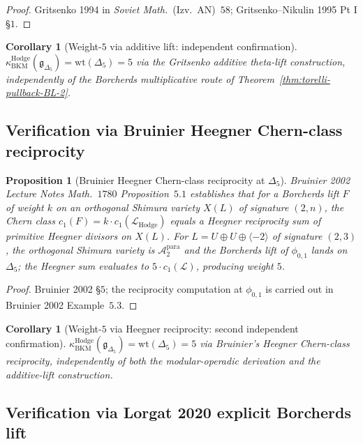 \documentclass[11pt]{article}
\newtheorem{proposition}[theorem]{Proposition}
\newtheorem{corollary}[theorem]{Corollary}
\providecommand{\cA}{\mathcal{A}}
\providecommand{\cL}{\mathcal{L}}
\providecommand{\fg}{\mathfrak{g}}
\providecommand{\kHodge}{\kappa_{\mathrm{BKM}}^{\mathrm{Hodge}}}
\begin{document}
\begin{proof}
Gritsenko 1994 in \emph{Soviet Math.}~(Izv.\ AN)~$58$; Gritsenko--Nikulin
1995 Pt I \S$1$.
\end{proof}

\begin{corollary}[Weight-$5$ via additive lift: independent confirmation]
\label{cor:additive-weight-5-BL-2}
$\kHodge(\fg_{\Delta_5}) = \mathrm{wt}(\Delta_5) = 5$ via the Gritsenko
additive theta-lift construction, independently of the Borcherds
multiplicative route of Theorem~\ref{thm:torelli-pullback-BL-2}.
\end{corollary}

\subsection{Verification via Bruinier Heegner Chern-class reciprocity}

\begin{proposition}[Bruinier Heegner Chern-class reciprocity at $\Delta_5$]
\label{prop:bruinier-heegner-BL-2}
Bruinier 2002 \emph{Lecture Notes Math.}~$1780$ Proposition~$5.1$
establishes that for a Borcherds lift $F$ of weight $k$ on an
orthogonal Shimura variety $X(L)$ of signature $(2, n)$, the Chern
class $c_1(F) = k \cdot c_1(\cL_{\mathrm{Hodge}})$ equals a Heegner
reciprocity sum of primitive Heegner divisors on $X(L)$. For
$L = U \oplus U \oplus \langle -2 \rangle$ of signature $(2, 3)$,
the orthogonal Shimura variety is $\cA_2^{\mathrm{para}}$ and the
Borcherds lift of $\phi_{0, 1}$ lands on $\Delta_5$; the Heegner sum
evaluates to $5 \cdot c_1(\cL)$, producing weight $5$.
\end{proposition}

\begin{proof}
Bruinier 2002 \S$5$; the reciprocity computation at $\phi_{0, 1}$ is
carried out in Bruinier 2002 Example~$5.3$.
\end{proof}

\begin{corollary}[Weight-$5$ via Heegner reciprocity: second independent confirmation]
\label{cor:heegner-weight-5-BL-2}
$\kHodge(\fg_{\Delta_5}) = \mathrm{wt}(\Delta_5) = 5$ via Bruinier's
Heegner Chern-class reciprocity, independently of both the modular-operadic
derivation and the additive-lift construction.
\end{corollary}

\subsection{Verification via Lorgat 2020 explicit Borcherds lift}
\end{document}
